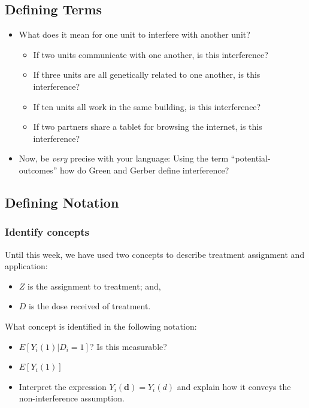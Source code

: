 \documentclass[
]{article}
\providecommand{\tightlist}{%
  \setlength{\itemsep}{0pt}\setlength{\parskip}{0pt}}
\theoremstyle{definition}
\theoremstyle{definition}
\theoremstyle{definition}
\theoremstyle{definition}
\theoremstyle{remark}
\begin{document}
\subsection{Defining Terms}\label{defining-terms}

\begin{itemize}
\tightlist
\item
  What does it mean for one unit to interfere with another unit?

  \begin{itemize}
  \tightlist
  \item
    If two units communicate with one another, is this interference?
  \item
    If three units are all genetically related to one another, is this interference?
  \item
    If ten units all work in the same building, is this interference?
  \item
    If two partners share a tablet for browsing the internet, is this interference?
  \end{itemize}
\item
  Now, be \emph{very} precise with your language: Using the term ``potential-outcomes'' how do Green and Gerber define interference?
\end{itemize}

\subsection{Defining Notation}\label{defining-notation}

\subsubsection{Identify concepts}\label{identify-concepts}

Until this week, we have used two concepts to describe treatment assignment and application:

\begin{itemize}
\tightlist
\item
  \(Z\) is the assignment to treatment; and,
\item
  \(D\) is the dose received of treatment.
\end{itemize}

What concept is identified in the following notation:

\begin{itemize}
\tightlist
\item
  \(E[Y_{i}(1) | D_{i} = 1]\)? Is this measurable?
\item
  \(E[Y_{i}(1)]\)
\item
  Interpret the expression \(Y_{i}(\mathbf{d}) = Y_{i}(d)\) and explain how it conveys the non-interference assumption.
\end{itemize}
\end{document}
